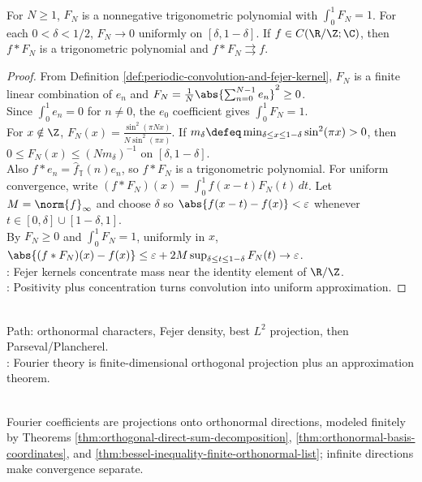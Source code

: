 \begin{theorem} \label{thm:fejer-periodic-approximation-identity} \\
For $N\geq1$, $F_N$ is a nonnegative trigonometric polynomial with $\int_0^1F_N=1$. For each $0<\delta<1/2$, $F_N\to0$ uniformly on $[\delta,1-\delta]$. If $f\in C(\R/\Z;\C)$, then $f*F_N$ is a trigonometric polynomial and $f*F_N\rightrightarrows f$.
\begin{proof}
From Definition \ref{def:periodic-convolution-and-fejer-kernel}, $F_N$ is a finite linear combination of $e_n$ and $F_N=\frac1N\abs{\sum_{n=0}^{N-1}e_n}^2\geq0$.\\
Since $\int_0^1e_n=0$ for $n\neq0$, the $e_0$ coefficient gives $\int_0^1F_N=1$.\\
For $x\notin\Z$, $F_N(x)=\frac{\sin^2(\pi Nx)}{N\sin^2(\pi x)}$. If $m_\delta\defeq\min_{\delta\leq x\leq1-\delta}\sin^2(\pi x)>0$, then $0\leq F_N(x)\leq (Nm_\delta)^{-1}$ on $[\delta,1-\delta]$.\\
Also $f*e_n=\widehat f_{\mathbb{T}}(n)e_n$, so $f*F_N$ is a trigonometric polynomial. For uniform convergence, write $(f*F_N)(x)=\int_0^1f(x-t)F_N(t)\,dt$. Let $M=\norm{f}_\infty$ and choose $\delta$ so $\abs{f(x-t)-f(x)}<\varepsilon$ whenever $t\in[0,\delta]\cup[1-\delta,1]$.\\
By $F_N\geq0$ and $\int_0^1F_N=1$, uniformly in $x$, $\abs{(f*F_N)(x)-f(x)} \leq \varepsilon+2M\sup_{\delta\leq t\leq1-\delta}F_N(t)\to \varepsilon$.\\
: Fejer kernels concentrate mass near the identity element of $\R/\Z$.\\
: Positivity plus concentration turns convolution into uniform approximation.
\end{proof}
\end{theorem}

\begin{perspective} \label{per:fourier-plancherel-roadmap-tao} \\
Path: orthonormal characters, Fejer density, best $L^2$ projection, then Parseval/Plancherel.\\
: Fourier theory is finite-dimensional orthogonal projection plus an approximation theorem.
\end{perspective}

\begin{perspective} \label{per:fourier-coefficients-as-projections} \\
Fourier coefficients are projections onto orthonormal directions, modeled finitely by Theorems \ref{thm:orthogonal-direct-sum-decomposition}, \ref{thm:orthonormal-basis-coordinates}, and \ref{thm:bessel-inequality-finite-orthonormal-list}; infinite directions make convergence separate.
\end{perspective}

